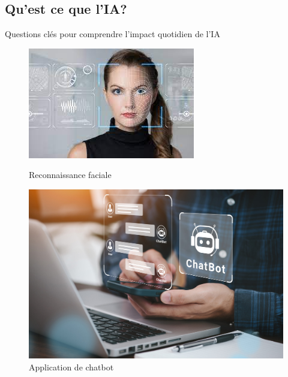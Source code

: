 \documentclass{beamer}
\begin{document}
\subsection{Qu'est ce que l'IA?}
\begin{frame}{Questions clés pour comprendre l'impact quotidien de l'IA}
	
	\begin{figure}[h]
		\centering
		\begin{minipage}{0.48\textwidth}
			\centering
			\includegraphics[width=\linewidth]{rf.jpeg}
			\caption{Reconnaissance faciale}
		\end{minipage}\hfill
		\begin{minipage}{0.48\textwidth}
			\centering
			\includegraphics[width=\linewidth]{ChatBot.jpg}
			\caption{Application de chatbot}
		\end{minipage}

	\end{figure}
\end{frame}
\end{document}
